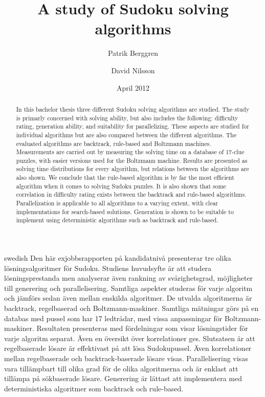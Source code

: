 \documentclass[a4paper,11pt]{kth-mag}
\title{A study of Sudoku solving algorithms}
\subtitle{}
\author{Patrik Berggren \and David Nilsson}
\date{April 2012}
\begin{document}
\frontmatter
\pagestyle{empty}
\removepagenumbers
\maketitle
{}
\begin{abstract}
In this bachelor thesis three different Sudoku solving algorithms are studied.
The study is primarly concerned with solving ability, but also includes the following: difficulty rating, generation ability, and suitability for parallelizing.
These aspects are studied for individual algorithms but are also compared between the different algorithms.
The evaluated algorithms are backtrack, rule-based and Boltzmann machines.
Measurements are carried out by measuring the solving time on a database of 17-clue puzzles, with easier versions used for the Boltzmann machine.
Results are presented as solving time distributions for every algorithm, but relations between the algorithms are also shown.
We conclude that the rule-based algorithm is by far the most efficient algorithm when it comes to solving Sudoku puzzles.
It is also shown that some correlation in difficulty rating exists between the backtrack and rule-based algorithms.
Parallelization is applicable to all algorithms to a varying extent, with clear implementations for search-based solutions.
Generation is shown to be suitable to implement using deterministic algorithms such as backtrack and rule-based.

\end{abstract}
\clearpage
\begin{foreignabstract}{swedish}
Den här exjobbsrapporten på kandidatnivå presenterar tre olika lösningsalgoritmer för Sudoku.
Studiens huvudsyfte är att studera lösningsprestanda men analyserar även rankning av svårighetsgrad, möjligheter till generering och parallelisering.
Samtliga aspekter studeras för varje algoritm och jämförs sedan även mellan enskilda algoritmer.
De utvalda algoritmerna är backtrack, regelbaserad och Boltzmann-maskiner.
Samtliga mätningar görs på en databas med pussel som har 17 ledtrådar, med vissa anpassningar för Boltzmann-maskiner.
Resultaten presenteras med fördelningar som visar lösningstider för varje algoritm separat. Även en översikt över korrelationer ges.
Slutsatsen är att regelbaserade lösare är effektivast på att lösa Sudokupussel.
Även korrelationer mellan regelbaserade och backtrack-baserade lösare visas.
Parallelisering visas vara tillämpbart till olika grad för de olika algoritmerna och är enklast att tillämpa på sökbaserade lösare.
Generering är lättast att implementera med deterministiska algoritmer som backtrack och rule-based.
\end{foreignabstract}
\clearpage
\end{document}
